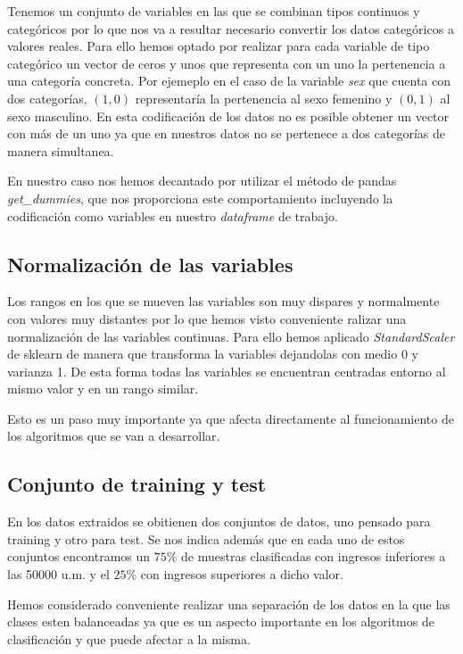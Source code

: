\documentclass[a4paper,11pt]{article}
\begin{document}
Tenemos un conjunto de variables en las que se combinan tipos continuos y
categóricos por lo que nos va a resultar necesario convertir los datos
categóricos a valores reales. Para ello hemos optado por realizar para cada
variable de tipo categórico un vector de ceros y unos que representa con un uno
la pertenencia a una categoría concreta. Por ejemeplo en el caso de la variable
\textit{sex} que cuenta con dos categorías, $(1,0)$ representaría la pertenencia
al sexo femenino y $(0,1)$ al sexo masculino. En esta codificación de los datos
no es posible obtener un vector con más de un uno ya que en nuestros datos no se
pertenece a dos categorías de manera simultanea.

En nuestro caso nos hemos decantado por utilizar el método de pandas
\textit{get\_dummies}, que nos proporciona este comportamiento incluyendo la
codificación como variables en nuestro \textit{dataframe} de trabajo.

\subsection{Normalización de las variables}

Los rangos en los que se mueven las variables son muy dispares y normalmente con
valores muy distantes por lo que hemos visto conveniente ralizar una
normalización de las variables continuas. Para ello hemos aplicado
\textit{StandardScaler} de sklearn de manera que transforma la variables
dejandolas con medio 0 y varianza 1. De esta forma  todas las variables se
encuentran centradas entorno al mismo valor y en un rango similar. 

Esto es un paso muy importante ya que afecta directamente al funcionamiento 
de los algoritmos que se van a desarrollar.

\subsection{Conjunto de training y test}

En los datos extraidos se obitienen dos conjuntos de datos, uno pensado para
training y otro para test. Se nos indica además que en cada uno de estos
conjuntos encontramos un $75\%$ de muestras clasificadas con ingresos inferiores
a las 50000 u.m. y el $25\%$ con ingresos superiores a dicho valor. 

Hemos considerado conveniente realizar una separación de los datos en la que las
clases esten balanceadas ya que es un aspecto importante en los algoritmos de
clasificación y que puede afectar a la misma. 
\end{document}
